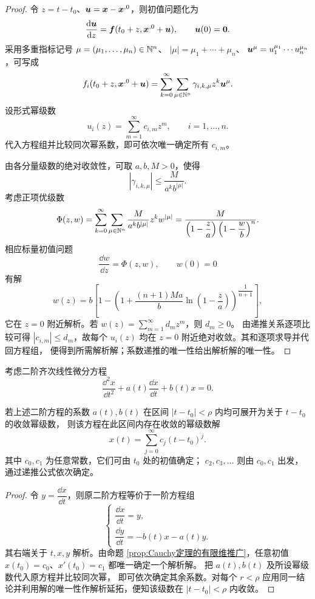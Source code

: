 \begin{proof}
	令 $z=t-t_0$、$\boldsymbol{u}=\boldsymbol{x}-\boldsymbol{x}^{,0}$，则初值问题化为
	\[
		\dfrac{\mathrm{d}\boldsymbol{u}}{\mathrm{d} z}
		=\boldsymbol{f}(t_0+z,\boldsymbol{x}^{,0}+\boldsymbol{u}),
		\qquad \boldsymbol{u}(0)=\boldsymbol{0}.
	\]
	采用多重指标记号
	$\mu=(\mu_1,\ldots,\mu_n)\in\mathbb{N}^n$、
	$|\mu|=\mu_1+\cdots+\mu_n$、
	$\boldsymbol{u}^{\mu}=u_1^{\mu_1}\cdots u_n^{\mu_n}$，可写成
	\[
		f_i(t_0+z,\boldsymbol{x}^{,0}+\boldsymbol{u})
		=\sum_{k=0}^{\infty}\sum_{\mu\in\mathbb{N}^n}
		\gamma_{i,k,\mu}z^k\boldsymbol{u}^{\mu}.
	\]
	设形式幂级数
	\[
		u_i(z)=\sum_{m=1}^{\infty}c_{i,m}z^m,
		\qquad i=1,\ldots,n.
	\]
	代入方程组并比较同次幂系数，即可依次唯一确定所有 $c_{i,m}$。

	由各分量级数的绝对收敛性，可取 $a,b,M>0$，使得
	\[
		|\gamma_{i,k,\mu}|
		\leq\dfrac{M}{a^k b^{|\mu|}}.
	\]
	考虑正项优级数
	\[
		\Phi(z,w)
		=\sum_{k=0}^{\infty}\sum_{\mu\in\mathbb{N}^n}
		\dfrac{M}{a^k b^{|\mu|}}z^kw^{|\mu|}
		=\dfrac{M}{\left(1-\dfrac{z}{a}\right)
		\left(1-\dfrac{w}{b}\right)^n}.
	\]
	相应标量初值问题
	\[
		\dfrac{\dd w}{\dd z}=\Phi(z,w),
		\qquad w(0)=0
	\]
	有解
	\[
		w(z)=b\left[
		1-\left(
		1+\dfrac{(n+1)Ma}{b}\ln\left(1-\dfrac{z}{a}\right)
		\right)^{\!\dfrac{1}{n+1}}
		\right],
	\]
	它在 $z=0$ 附近解析。若
	$w(z)=\sum_{m=1}^{\infty}d_mz^m$，则 $d_m\geq0$。
	由递推关系逐项比较可得 $|c_{i,m}|\leq d_m$，故每个
	$u_i(z)$ 均在 $z=0$ 附近绝对收敛。其和逐项求导并代回方程组，
	便得到所需解析解；系数递推的唯一性给出解析解的唯一性。
\end{proof}

考虑二阶齐次线性微分方程
\[
	\dfrac{\dd^2x}{\dd t^2}
	+a(t)\dfrac{\dd x}{\dd t}+b(t)x=0.
\]

\begin{proposition}\label{thm:二阶解析系数方程的幂级数解}
	若上述二阶方程的系数 $a(t),b(t)$
	在区间 $|t-t_0|<\rho$ 内均可展开为关于 $t-t_0$ 的收敛幂级数，
	则该方程在此区间内存在收敛的幂级数解
	\[
		x(t)=\sum_{j=0}^{\infty}c_j(t-t_0)^j.
	\]
	其中 $c_0,c_1$ 为任意常数，它们可由 $t_0$ 处的初值确定；
	$c_2,c_3,\ldots$ 则由 $c_0,c_1$ 出发，通过递推公式依次确定。
\end{proposition}

\begin{proof}
	令 $y=\dfrac{\dd x}{\dd t}$，则原二阶方程等价于一阶方程组
	\[
		\begin{cases}
			\dfrac{\dd x}{\dd t}=y,\\[6pt]
			\dfrac{\dd y}{\dd t}=-b(t)x-a(t)y.
		\end{cases}
	\]
	其右端关于 $t,x,y$ 解析。由命题
	\ref{prop:Cauchy定理的有限维推广}，任意初值
	$x(t_0)=c_0$、$x'(t_0)=c_1$ 都唯一确定一个解析解。
	把 $a(t),b(t)$ 及所设幂级数代入原方程并比较同次幂，
	即可依次确定其余系数。对每个
	$r<\rho$ 应用同一结论并利用解的唯一性作解析延拓，便知该级数在
	$|t-t_0|<\rho$ 内收敛。
\end{proof}

